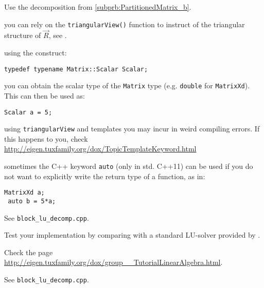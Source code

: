 \begin{problem}
\begin{subproblem}[3]
\begin{hint}
 Use the decomposition from \ref{subprb:PartitionedMatrix_b}.
\end{hint}

\begin{hint}
 you can rely on the \verb|triangularView()| function to instruct \Eigen{} of the
 triangular structure of $\vec{R}$, see . 
\end{hint}

\begin{hint}
 using the construct:
\begin{lstlisting}[style=cppsimple]
    typedef typename Matrix::Scalar Scalar; 
\end{lstlisting}
you can obtain the scalar type of the \verb|Matrix| type (e.g. \verb|double| for \verb|MatrixXd|). This can then be used as:
\begin{lstlisting}[style=cppsimple]
 Scalar a = 5;
\end{lstlisting}
\end{hint}

\begin{hint}
 using \verb|triangularView| and templates you may incur in weird compiling errors. If this happens to you, check \href{http://eigen.tuxfamily.org/dox/TopicTemplateKeyword.html}{http://eigen.tuxfamily.org/dox/TopicTemplateKeyword.html}
\end{hint}

\begin{hint}
 sometimes the C++ keyword \verb|auto| (only in std. C++11) can be used if you do not want to explicitly write the return type of a function, as in:
\begin{lstlisting}[style=cppsimple]
 MatrixXd a;
 auto b = 5*a;
\end{lstlisting}
\end{hint}

\begin{solution}
See \texttt{block\_lu\_decomp.cpp}.
% 
\end{solution}
\end{subproblem}


\begin{subproblem}[3]
\label{subprb:PartitionedMatrix_e}
 Test your implementation by comparing with a standard LU-solver provided by \Eigen{}.
 
 \begin{hint}
  Check the page \href{http://eigen.tuxfamily.org/dox/group\_\_TutorialLinearAlgebra.html}{http://eigen.tuxfamily.org/dox/group\_\_TutorialLinearAlgebra.html}.
 \end{hint}
\begin{solution}
 See \texttt{block\_lu\_decomp.cpp}.
% 
\end{solution}
\end{subproblem}


\end{problem}
